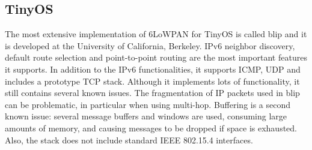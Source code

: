 \documentclass[10pt]{article}
\begin{document}
\subsection{TinyOS}
The most extensive implementation of 6LoWPAN for TinyOS is called blip and it is developed at the University of California, Berkeley.  IPv6 neighbor discovery, default route selection and point-to-point routing are the most important features it supports. In addition to the IPv6 functionalities, it supports ICMP, UDP and includes a prototype TCP stack.  Although it implements lots of functionality, it still contains several known issues.  The fragmentation of IP packets used in blip can be problematic, in particular when using multi-hop.  Buffering is a second known issue: several message buffers and windows are used, consuming large amounts of memory, and causing messages to be dropped if space is exhausted. Also, the stack does not include standard IEEE 802.15.4 interfaces.  
\end{document}
